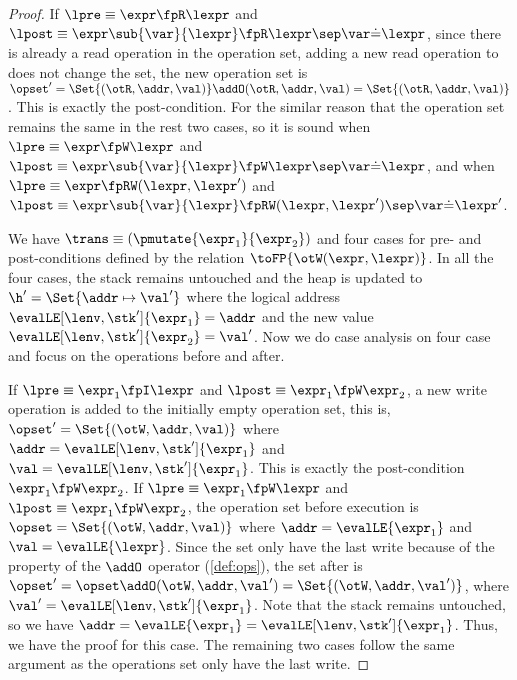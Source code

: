 \begin{proof}
If \( \lpre \equiv \expr \fpR \lexpr \) and \( \lpost \equiv \expr\sub{\var}{\lexpr} \fpR \lexpr \sep \var \dot= \lexpr \), since there is already a read operation in the operation set, adding a new read operation to does not change the set, \ie the new operation set  is \( \opset' = \Set{(\otR, \addr, \val)} \addO (\otR, \addr, \val ) = \Set{(\otR, \addr, \val)} \).
This is exactly the post-condition.
For the similar reason that the operation set remains the same in the rest two cases, so it is sound when \( \lpre \equiv \expr \fpW \lexpr \) and \( \lpost \equiv \expr\sub{\var}{\lexpr} \fpW \lexpr \sep \var \dot= \lexpr \), and when \( \lpre \equiv \expr \fpRW (\lexpr,\lexpr') \) and \( \lpost \equiv \expr\sub{\var}{\lexpr} \fpRW (\lexpr,\lexpr') \sep \var \dot= \lexpr' \).


We have  \( \trans \equiv (\pmutate{\expr_{1}}{\expr_{2}}) \) and four cases for pre- and post-conditions defined by the relation \( \toFP{\otW(\expr, \lexpr)}\). 
In all the four cases, the stack remains untouched and the heap is updated to \( \h' = \Set{\addr \mapsto \val' }\) where the logical address \( \evalLE[\lenv,\stk']{\expr_{1}}  = \addr \) and the new value \( \evalLE[\lenv,\stk']{\expr_{2}} = \val'\).
Now we do case analysis on four case and focus on the operations before and after.

If \( \lpre \equiv \expr_{1} \fpI \lexpr \) and \( \lpost \equiv \expr_{1} \fpW \expr_{2} \), a new write operation is added to the initially empty operation set, this is, \( \opset' = \Set{(\otW, \addr, \val)}\) where \( \addr = \evalLE[\lenv,\stk']{\expr_{1}}\) and \( \val = \evalLE[\lenv,\stk']{\expr_{1}}\).
This is exactly the post-condition \( \expr_{1} \fpW \expr_{2} \).
If \( \lpre \equiv \expr_{1} \fpW \lexpr \) and \( \lpost \equiv \expr_{1} \fpW \expr_{2} \), the operation set before execution is \( \opset = \Set{(\otW, \addr, \val)}\) where \( \addr = \evalLE{\expr_{1}}\) and \( \val = \evalLE{\lexpr}\).
Since the set only have the last write because of the property of the \( \addO \) operator (\cref{def:ops}), the set after is \( \opset' = \opset \addO (\otW, \addr, \val') = \Set{(\otW, \addr, \val')}\), where \( \val' = \evalLE[\lenv,\stk']{\expr_{1}}\).
Note that the stack remains untouched, so we have \( \addr = \evalLE{\expr_{1}} = \evalLE[\lenv,\stk']{\expr_{1}} \).
Thus, we have the proof for this case.
The remaining two cases follow the same argument as the operations set only have the last write.


\end{proof}
